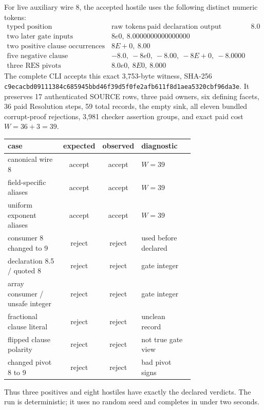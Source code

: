 \documentclass[11pt]{article}
\begin{document}
For live auxiliary wire 8, the accepted hostile uses the following distinct
numeric tokens:
\[
\begin{array}{c|l}
\text{typed position}&\text{raw tokens}\ 
\hline
\text{paid declaration output}&8.0\\
\text{two later gate inputs}&8e0,\ 8.0000000000000000\\
\text{two positive clause occurrences}&8E{+}0,\ 8.00\\
\text{five negative clause occurrences}&-8.0,\ -8e0,\ -8.00,\ -8E{+}0,\ -8.0000\\
\text{three RES pivots}&8.0e0,\ 8E0,\ 8.000
\end{array}
\]
The complete CLI accepts this exact 3,753-byte witness, SHA-256
\texttt{c9ecacbd09111384c685945bbd46f39d5f0fe2afb611f8d1aea5320cbf96da3e}.
It preserves 17 authenticated SOURCE rows, three paid owners, six defining
facets, 36 paid Resolution steps, 59 total records, the empty sink, all eleven
bundled corrupt-proof rejections, 3,981 checker assertion groups, and exact
paid cost $W=36+3=39$.

\begin{center}
\begin{tabular}{p{0.38\linewidth}ccp{0.34\linewidth}}
\toprule
case&expected&observed&diagnostic\\\midrule
canonical wire 8&accept&accept&$W=39$\\
field-specific aliases&accept&accept&$W=39$\\
uniform exponent aliases&accept&accept&$W=39$\\
consumer 8 changed to 9&reject&reject&used before declared\\
declaration 8.5 / quoted 8&reject&reject&gate integer\\
array consumer / unsafe integer&reject&reject&gate integer\\
fractional clause literal&reject&reject&unclean record\\
flipped clause polarity&reject&reject&not true gate view\\
changed pivot 8 to 9&reject&reject&bad pivot signs\\\bottomrule
\end{tabular}
\end{center}
Thus three positives and eight hostiles have exactly the declared verdicts.
The run is deterministic; it uses no random seed and completes in under two
seconds.
\end{document}
